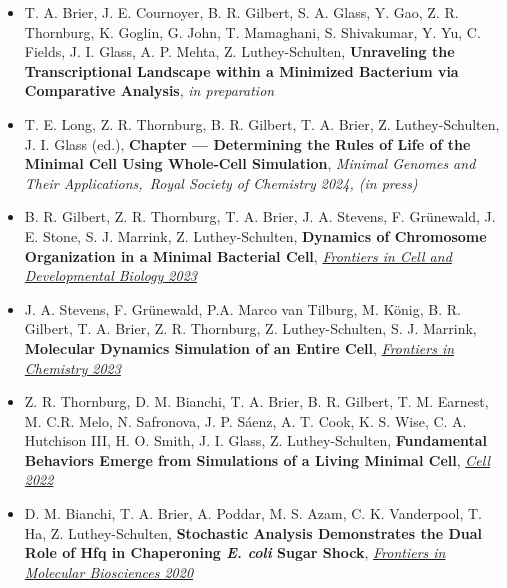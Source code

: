 \documentclass[letterpaper,10pt]{article}
\begin{document}
\begin{itemize}[leftmargin=0.35in, label={}, labelindent=5pt,itemindent=-15pt]
  \setlength\itemsep{-0.4em}
\item \textcolor{color1}{T. A. Brier}, J. E. Cournoyer, B. R. Gilbert, S. A. Glass, Y. Gao, Z. R. Thornburg, K. Goglin, G. John, T. Mamaghani, S. Shivakumar,   Y. Yu, C. Fields, J. I. Glass, A. P. Mehta, Z. Luthey-Schulten, \textbf{Unraveling the Transcriptional Landscape within a Minimized Bacterium via Comparative Analysis}, \textit{in preparation}

\item T. E. Long, Z. R. Thornburg, B. R. Gilbert, \textcolor{color1}{T. A. Brier}, Z. Luthey-Schulten, J. I. Glass (ed.), \textbf{Chapter --- Determining the Rules of Life of the Minimal Cell Using Whole-Cell Simulation}, \textit{Minimal Genomes and Their Applications,~Royal Society of Chemistry 2024, (in press)}

\item B. R. Gilbert, Z. R. Thornburg, \textcolor{color1}{T. A. Brier}, J. A. Stevens, F. Gr\"{u}newald, J. E. Stone, S. J. Marrink, Z. Luthey-Schulten, \textbf{Dynamics of Chromosome Organization in a Minimal Bacterial Cell}, \href{https://doi.org/10.3389/fcell.2023.1214962}{\textit{Frontiers in Cell and Developmental Biology 2023}}%

\item J. A. Stevens, F. Gr\"{u}newald, P.A. Marco van Tilburg, M. K\"{o}nig, B. R. Gilbert, \textcolor{color1}{T. A. Brier}, Z. R. Thornburg, Z. Luthey-Schulten, S. J. Marrink, \textbf{Molecular Dynamics Simulation of an Entire Cell}, \href{https://doi.org/10.3389/fchem.2023.1106495}{\textit{Frontiers in Chemistry 2023}}%

\item Z. R. Thornburg, D. M. Bianchi, \textcolor{color1}{T. A. Brier}, B. R. Gilbert, T. M. Earnest, M. C.R. Melo, N. Safronova, J. P. S\'{a}enz, A. T. Cook, K. S. Wise, C. A. Hutchison III, H. O. Smith, J. I. Glass, Z. Luthey-Schulten, \textbf{Fundamental Behaviors Emerge from Simulations of a Living Minimal Cell}, \href{https://doi.org/10.1016/j.cell.2021.12.025}{\textit{Cell 2022}}%

\item D. M. Bianchi, \textcolor{color1}{T. A. Brier}, A. Poddar, M. S. Azam, C. K. Vanderpool, T. Ha, Z. Luthey-Schulten, \textbf{Stochastic Analysis Demonstrates the Dual Role of Hfq in Chaperoning \textit{E. coli} Sugar Shock}, \href{https://doi.org/10.3389/fmolb.2020.593826}{\textit{Frontiers in Molecular Biosciences 2020}}%


\end{itemize}
\end{document}
